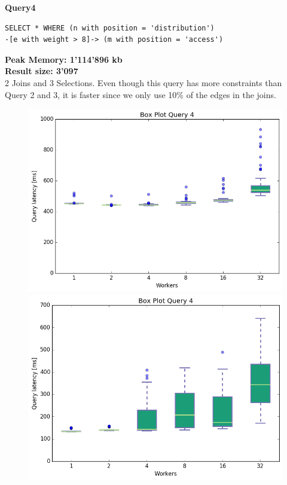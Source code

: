 \documentclass[11pt,singlecolumn]{scrartcl}
\begin{document}
\clearpage
\textbf{Query4}\\
\begin{verbatim}
SELECT * WHERE (n with position = 'distribution')
-[e with weight > 8]-> (m with position = 'access')\end{verbatim}

\textbf{Peak Memory: 1'114'896 kb}\\
\textbf{Result size: 3'097}\\
2 Joins and 3 Selections. Even though this query has more constraints than Query 2 and 3, it is faster since we only use 10\% of the edges in the joins. 
\clearpage
\begin{figure}[!tbp]
  \centering
  \RawFloats
  \begin{minipage}[b]{0.5\textwidth}
    \includegraphics[width=\textwidth]{boxesfl/q4}
  \end{minipage}
  \hfill
  \begin{minipage}[b]{0.5\textwidth}
    \includegraphics[width=\textwidth]{boxesfs/q4}
  \end{minipage}
\end{figure}
\end{document}
